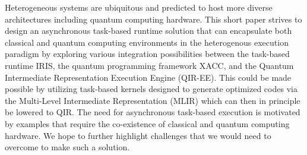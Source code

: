 Heterogeneous systems are ubiquitous and predicted to host more diverse architectures including quantum computing hardware. This short paper strives to design an asynchronous task-based runtime solution that can encapsulate both classical and quantum computing environments in the heterogenous execution paradigm by exploring various integration possibilities between the task-based runtime IRIS, the quantum programming framework XACC, and the Quantum Intermediate Representation Execution Engine (QIR-EE). This could be made possible by utilizing task-based kernels designed to generate optimized codes via the Multi-Level Intermediate Representation (MLIR) which can then in principle be lowered to QIR. The need for asynchronous task-based execution is motivated by examples that require the co-existence of classical and quantum computing hardware. We hope to further highlight challenges that we would need to overcome to make such a solution.
